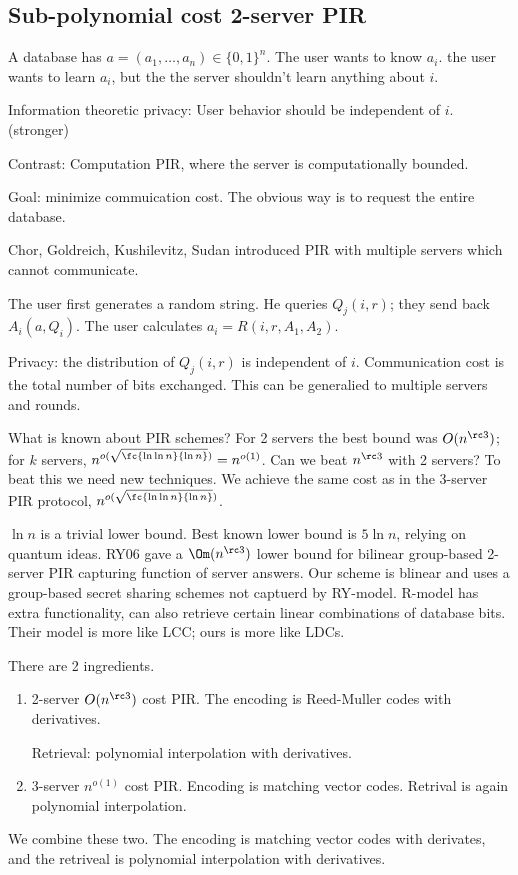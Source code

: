 \subsection{Sub-polynomial cost 2-server PIR}

A database has $a=(a_1,\ldots, a_n)\in \{0,1\}^n$. The user wants to know $a_i$. the user wants to learn $a_i$, but the the server shouldn't learn anything about $i$.

Information theoretic privacy: User behavior should be independent of $i$. (stronger)

Contrast: Computation PIR, where the server is computationally bounded.

Goal: minimize commuication cost. The obvious way is to request the entire database.

Chor, Goldreich, Kushilevitz, Sudan introduced PIR with multiple servers which cannot communicate.

The user first generates a random string. He queries $Q_j(i,r)$; they send back $A_i(a,Q_i)$. The user calculates $a_i=R(i,r,A_1,A_2)$. 

Privacy: the distribution of $Q_j(i,r)$ is independent of $i$. Communication cost is the total number of bits exchanged. This can be generalied to multiple servers and rounds.

What is known about PIR schemes? 
For 2 servers the best bound was $O(n^{\rc 3})$; for $k$ servers, $n^{o(\sqrt{\fc{\ln\ln n}{\ln n}})}=n^{o(1)}$. 
Can we beat $n^{\rc 3}$ with 2 servers? To beat this we need new techniques. We achieve the same cost as in the 3-server PIR protocol, $n^{o(\sqrt{\fc{\ln\ln n}{\ln n}})}$.

$\ln n$  is a trivial lower bound. Best known lower bound is $5\ln n$, relying on quantum ideas. 
RY06 gave a $\Om(n^{\rc 3})$ lower bound for bilinear group-based 2-server PIR capturing function of server answers. Our scheme is blinear and uses a group-based secret sharing schemes not captuerd by RY-model. R-model has extra functionality, can also retrieve certain linear combinations of database bits. Their model is more like LCC; ours is more like LDCs.

There are 2 ingredients.
\begin{enumerate}
\item
2-server $O(n^{\rc 3})$ cost PIR. The encoding is Reed-Muller codes with derivatives. 

Retrieval: polynomial interpolation with derivatives. 
\item
3-server $n^{o(1)}$ cost PIR. Encoding is matching vector codes. Retrival is again polynomial interpolation.
\end{enumerate}
We combine these two. The encoding is matching vector codes with derivates, and the retriveal is polynomial interpolation with derivatives.


